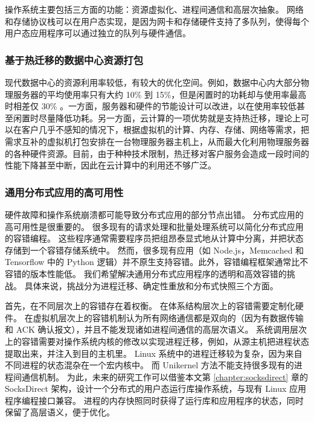 操作系统主要包括三方面的功能：资源虚拟化、进程间通信和高层次抽象。
网络和存储协议栈可以在用户态实现，是因为网卡和存储硬件支持了多队列，使得每个用户态应用程序可以通过独立的队列与硬件通信。


\subsubsection{基于热迁移的数据中心资源打包}
\label{future:resource-packing}

现代数据中心的资源利用率较低，有较大的优化空间。例如，数据中心内大部分物理服务器的平均使用率只有大约 10\% 到 15\%，但是闲置时的功耗却与使用率最高时相差仅 30\% \cite{barroso2018datacenter}。一方面，服务器和硬件的节能设计可以改进，以在使用率较低甚至闲置时尽量降低功耗。另一方面，云计算的一项优势就是支持热迁移，理论上可以在客户几乎不感知的情况下，根据虚拟机的计算、内存、存储、网络等需求，把需求互补的虚拟机打包安排在一台物理服务器主机上，从而最大化利用物理服务器的各种硬件资源。目前，由于种种技术限制，热迁移对客户服务会造成一段时间的性能下降甚至中断，因此在云计算中的利用还不够广泛。

\subsubsection{通用分布式应用的高可用性}
\label{future:ftlinux}

硬件故障和操作系统崩溃都可能导致分布式应用的部分节点出错。
分布式应用的高可用性是很重要的。
很多现有的请求处理和批量处理系统可以简化分布式应用的容错编程。
这些程序通常需要程序员把组昂泰显式地从计算中分离，并把状态存储到一个容错存储系统中。
然而，很多现有应用（如 Node.js，Memcached 和 Tensorflow 中的 Python 逻辑）并不原生支持容错。此外，容错编程框架通常比不容错的版本性能低。
我们希望解决通用分布式应用程序的透明和高效容错的挑战。
具体来说，挑战分为进程迁移、确定性重放和分布式快照三个方面。

首先，在不同层次上的容错存在着权衡。
在体系结构层次上的容错需要定制化硬件。
在虚拟机层次上的容错机制认为所有网络通信都是双向的（因为有数据传输和 ACK 确认报文），并且不能发现诸如进程间通信的高层次语义。
系统调用层次上的容错需要对操作系统内核的修改以实现进程迁移，例如，从源主机把进程状态提取出来，并注入到目的主机里。
Linux 系统中的进程迁移较为复杂，因为来自不同进程的状态混杂在一个宏内核中。
而 Unikernel 方法不能支持很多现有的进程间通信机制。
为此，未来的研究工作可以借鉴本文第 \ref{chapter:socksdirect} 章的 SocksDirect 架构，设计一个分布式的用户态运行库操作系统，与现有 Linux 应用程序编程接口兼容。
进程的内存快照同时获得了运行库和应用程序的状态，同时保留了高层语义，便于优化。

